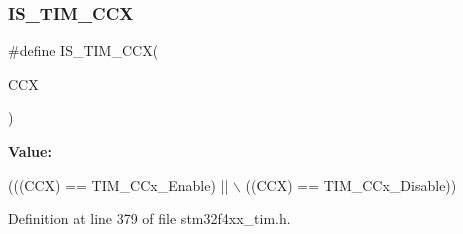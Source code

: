 \subsubsection{\texorpdfstring{I\+S\+\_\+\+T\+I\+M\+\_\+\+C\+CX}{IS\_TIM\_CCX}}
{\footnotesize\ttfamily \#define I\+S\+\_\+\+T\+I\+M\+\_\+\+C\+CX(\begin{DoxyParamCaption}\item[{}]{C\+CX }\end{DoxyParamCaption})}

{\bfseries Value\+:}
\begin{DoxyCode}
(((CCX) == TIM\_CCx\_Enable) || \(\backslash\)
                         ((CCX) == TIM\_CCx\_Disable))
\end{DoxyCode}


Definition at line 379 of file stm32f4xx\+\_\+tim.\+h.

